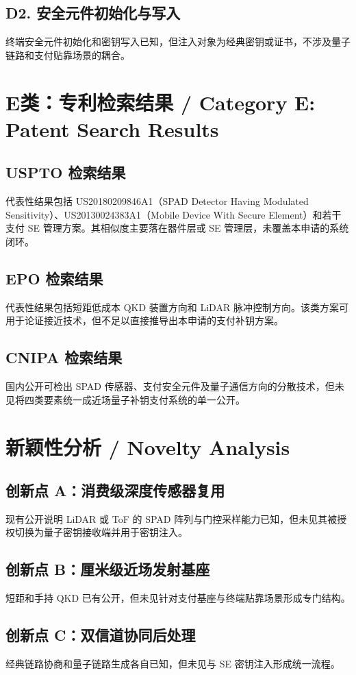 ﻿\documentclass[12pt,a4paper]{article}
\begin{document}
\subsection{D2. 安全元件初始化与写入}
终端安全元件初始化和密钥写入已知，但注入对象为经典密钥或证书，不涉及量子链路和支付贴靠场景的耦合。

\section{E类：专利检索结果 / Category E: Patent Search Results}
\subsection{USPTO 检索结果}
代表性结果包括 US20180209846A1（SPAD Detector Having Modulated Sensitivity）、US20130024383A1（Mobile Device With Secure Element）和若干支付 SE 管理方案。其相似度主要落在器件层或 SE 管理层，未覆盖本申请的系统闭环。

\subsection{EPO 检索结果}
代表性结果包括短距低成本 QKD 装置方向和 LiDAR 脉冲控制方向。该类方案可用于论证接近技术，但不足以直接推导出本申请的支付补钥方案。

\subsection{CNIPA 检索结果}
国内公开可检出 SPAD 传感器、支付安全元件及量子通信方向的分散技术，但未见将四类要素统一成近场量子补钥支付系统的单一公开。

\section{新颖性分析 / Novelty Analysis}
\subsection{创新点 A：消费级深度传感器复用}
现有公开说明 LiDAR 或 ToF 的 SPAD 阵列与门控采样能力已知，但未见其被授权切换为量子密钥接收端并用于密钥注入。

\subsection{创新点 B：厘米级近场发射基座}
短距和手持 QKD 已有公开，但未见针对支付基座与终端贴靠场景形成专门结构。

\subsection{创新点 C：双信道协同后处理}
经典链路协商和量子链路生成各自已知，但未见与 SE 密钥注入形成统一流程。
\end{document}
